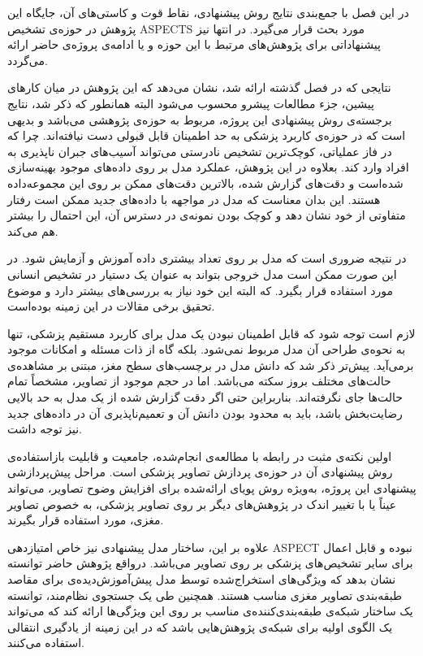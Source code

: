 

در این فصل با جمع‌بندی نتایج روش پیشنهادی، نقاط قوت و کاستی‌های آن، جایگاه این پژوهش در حوزه‌ی تشخیص ASPECTS 
مورد بحث قرار می‌گیرد.
در انتها نیز پیشنهاداتی برای پژوهش‌های مرتبط با این حوزه و یا ادامه‌ی پروژه‌ی حاضر ارائه می‌گردد. 



نتایجی که در فصل گذشته ارائه شد، نشان می‌دهد که این پژوهش در میان کارهای پیشین، جزء مطالعات پیشرو محسوب می‌شود
البته همانطور که ذکر شد، نتایج برجسته‌ی روش پیشنهادی این پروژه، مربوط به حوزه‌ی پژوهشی می‌باشد و بدیهی است که در حوزه‌ی کاربرد پزشکی
به حد اطمینان قابل قبولی دست نیافته‌اند.
چرا که در فاز عملیاتی، کوچک‌ترین تشخیص نادرستی می‌تواند آسیب‌های جبران ناپذیری به افراد وارد کند.
بعلاوه در این پژوهش، عملکرد مدل بر روی داده‌های موجود بهینه‌سازی شده‌است و دقت‌های گزارش شده، بالاترین دقت‌های ممکن بر روی این مجموعه‌داده هستند.
این بدان معناست که مدل در مواجهه با داده‌های جدید ممکن است رفتار متفاوتی از خود نشان دهد و کوچک بودن نمونه‌ی در دسترس آن، این احتمال را بیشتر هم می‌کند.

در نتیجه ضروری است که مدل بر روی تعداد بیشتری داده آموزش و آزمایش شود.
در این صورت ممکن است مدل خروجی بتواند به عنوان یک دستیار در تشخیص انسانی مورد استفاده قرار بگیرد.
که البته این خود نیاز به بررسی‌های بیشتر دارد و موضوع تحقیق برخی مقالات در این زمینه بوده‌است.

لازم است توجه شود که قابل اطمینان نبودن یک مدل برای کاربرد مستقیم پزشکی، تنها به نحوه‌ی طراحی آن مدل مربوط نمی‌شود.
بلکه گاه از ذات مسئله و امکانات موجود برمی‌آید.
پیش‌تر ذکر شد که دانش مدل در برچسب‌های سطح مغز، مبتنی بر مشاهده‌ی حالت‌های مختلف بروز سکته می‌باشد.
اما در حجم موجود از تصاویر، مشخصاً تمام حالت‌ها جای نگرفته‌اند.
بناربراین حتی اگر دقت گزارش شده از یک مدل به حد بالایی رضایت‌بخش باشد، باید به محدود بودن دانش آن و 
تعمیم‌ناپذیری آن در داده‌های جدید نیز توجه داشت.


اولین نکته‌ی مثبت در رابطه با مطالعه‌ی انجام‌شده، 
جامعیت و قابلیت بازاستفاده‌ی روش پیشنهادی آن در حوزه‌ی پردازش تصاویر پزشکی است.
مراحل پیش‌پردازشی پیشنهادی این پروژه، به‌ویژه روش پویای ارائه‌شده برای افزایش وضوح تصاویر، می‌تواند عیناً یا با تغییر اندک در پژوهش‌های دیگر بر روی تصاویر پزشکی، به خصوص تصاویر مغزی،
مورد استفاده قرار بگیرند. 

علاوه بر این، 
ساختار مدل پیشنهادی نیز خاص امتیازدهی ASPECT نبوده و قابل اعمال برای سایر تشخیص‌های پزشکی بر روی تصاویر می‌باشد.
درواقع پژوهش حاضر توانسته نشان بدهد که ویژگی‌های استخراج‌شده توسط مدل پیش‌آموزش‌دیده‌ی  برای مقاصد طبقه‌بندی تصاویر مغزی مناسب هستند.
همچنین طی یک جستجوی نظام‌مند، توانسته یک ساختار شبکه‌ی طبقه‌بندی‌کننده‌ی مناسب بر روی این ویژگی‌ها ارائه کند که می‌تواند یک الگوی اولیه برای شبکه‌ی پژوهش‌هایی باشد که در این زمینه از یادگیری انتقالی استفاده می‌کنند.

